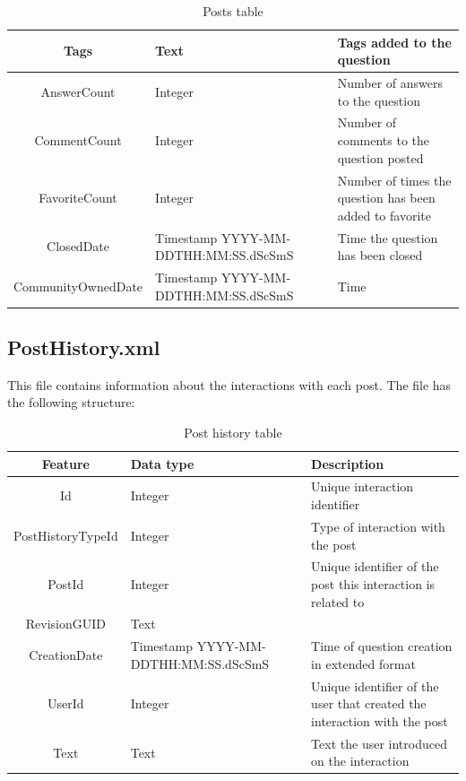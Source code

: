 \documentclass[11pt]{book} %
\begin{document}
\begin{table}[!ht]
\begin{tabular}{|c|p{}|p{}|}
          Tags & Text & Tags added to the question \\ \hline
          AnswerCount & Integer & Number of answers to the question \\ \hline
          CommentCount & Integer & Number of comments to the question posted \\ \hline
          FavoriteCount & Integer & Number of times the question has been added to favorite \\ \hline
          ClosedDate & Timestamp YYYY-MM-DDTHH:MM:SS.dScSmS & Time the question has been closed \\ \hline
          CommunityOwnedDate & Timestamp YYYY-MM-DDTHH:MM:SS.dScSmS & Time \\

          \hline
        \end{tabular}
        \caption{Posts table}
        \label{tab:posts}
      \end{table}

\newpage

    \subsection{PostHistory.xml}

      This file contains information about the interactions with each post. The file has the following structure:

      \begin{table}[!ht]
        \centering
        \begin{tabular}{|c|p{}|p{}|}
          \hline

          Feature & Data type & Description \\ \hline
          Id & Integer & Unique interaction identifier \\ \hline
          PostHistoryTypeId & Integer & Type of interaction with the post \\ \hline
          PostId & Integer & Unique identifier of the post this interaction is related to \\ \hline
          RevisionGUID & Text &  \\ \hline
          CreationDate & Timestamp YYYY-MM-DDTHH:MM:SS.dScSmS & Time of question creation in extended format \\ \hline
          UserId & Integer & Unique identifier of the user that created the interaction with the post \\ \hline
          Text & Text & Text the user introduced on the interaction \\ \hline

          \hline
        \end{tabular}
        \caption{Post history table}
        \label{tab:posthistory}
      \end{table}
\end{document}
